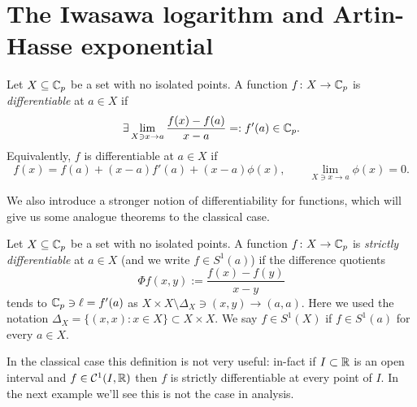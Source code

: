 	 \section{The Iwasawa logarithm and Artin-Hasse exponential}
	 	\begin{defn}
	 		Let $X \subseteq \mathbb{C}_p$ be a set with no isolated points. A function $f\colon X \to \mathbb{C}_p$ is \emph{differentiable} at $a \in X$ if
	 		\[
	 			\exists \lim_{X \ni x \to a} \frac{f(x) - f(a)}{x - a} =: f'(a) \in \mathbb{C}_p.
	 		\]
	 		Equivalently, $f$ is differentiable at $a \in X$ if 
	 		\[
	 			f(x) = f(a) + (x - a)f'(a) + (x - a)\phi(x), \qquad \lim_{X \ni x \to a} \phi(x) = 0.
	 		\]
	 	\end{defn}
 		We also introduce a stronger notion of differentiability for \padic functions, which will give us some analogue theorems to the classical case.
 		\begin{defn}
 			Let $X \subseteq \mathbb{C}_p$ be a set with no isolated points. A function $f\colon X \to \mathbb{C}_p$ is \emph{strictly differentiable} at $a \in X$ (and we write $f \in S^1(a)$) if the difference quotients
 			\[
 				\Phi f(x, y) := \frac{f(x) - f(y)}{x - y}
 			\]
 			tends to $\mathbb{C}_p \ni \ell = f'(a)$ as $X \times X \setminus \Delta_X \ni (x, y) \to (a, a)$. 
 			Here we used the notation $\Delta_X = \{(x, x) : x \in X \} \subset X \times X$.
 			We say $f \in S^1(X)$ if $f \in S^1(a)$ for every $a \in X$.
 		\end{defn}
 		In the classical case this definition is not very useful: in-fact if $I \subset \mathbb{R}$ is an open interval and $f \in \mathcal{C}^1(I, \mathbb{R})$ then $f$ is strictly differentiable at every point of $I$. In the next example we'll see this is not the case in \padic analysis.
